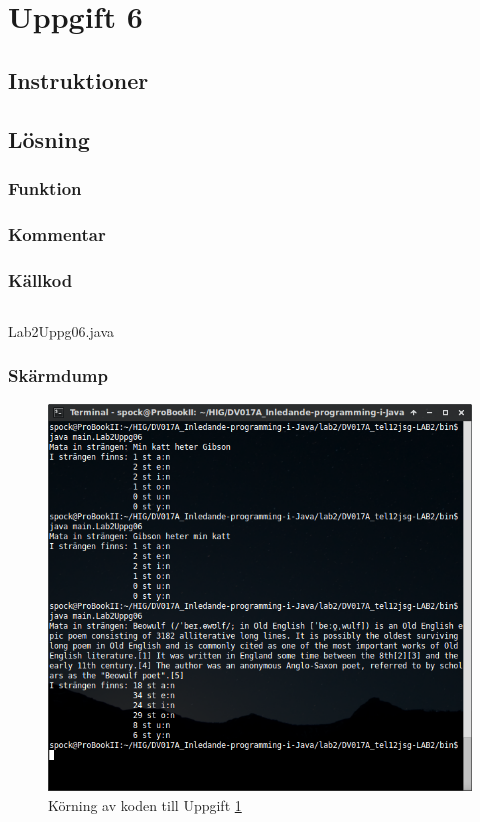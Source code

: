 \section{Uppgift 6}\label{sec:uppg06}

\subsection{Instruktioner}


\subsection{Lösning}
\subsubsection{Funktion}

\subsubsection{Kommentar}


\subsubsection{Källkod}
\inputminted[linenos]{java}{src/Lab2Uppg06.java}
\caption{Lab2Uppg06.java}
\label{src:uppg06}


\subsubsection{Skärmdump}
\begin{figure}[htbp]
    \centering
        \includegraphics[width=\linewidth]{img/06.png}
    \caption{Körning av koden till Uppgift \ref{sec:uppg06}}
    \label{fig:uppg06-screenshot}
\end{figure}

